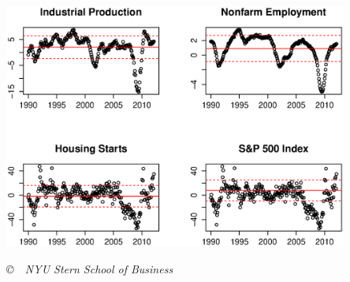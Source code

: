 \documentclass[12pt]{exam}
\begin{document}
\begin{questions}
\begin{solution}
\begin{center}
\includegraphics[width=0.85\textwidth]{ps3_q3_scorecard.eps}
\end{center}

\end{solution}

\end{questions}

\vfill \centerline{\it \copyright \ \number\year \
NYU Stern School of Business}
\end{document}
